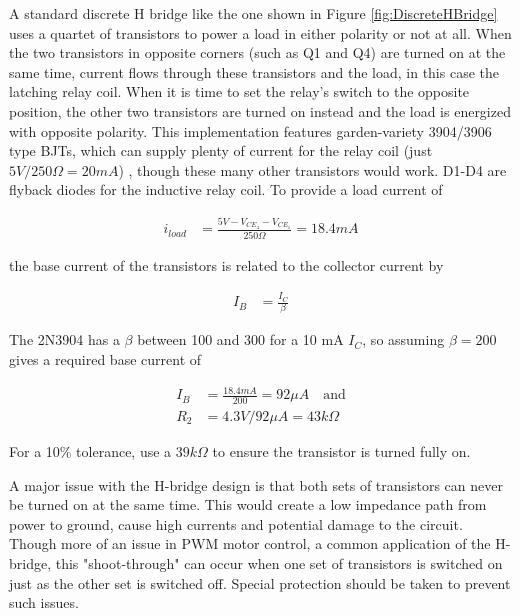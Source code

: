 \documentclass{article}
\begin{document}
		A standard discrete H bridge like the one shown in Figure \ref{fig:DiscreteHBridge} uses a quartet of transistors to power a load in either polarity or not at all.  When the two transistors in opposite corners (such as Q1 and Q4) are turned on at the same time, current flows through these transistors and the load, in this case the latching relay coil.  When it is time to set the relay's switch to the opposite position, the other two transistors are turned on instead and the load is energized with opposite polarity.  This implementation features garden-variety 3904/3906 type BJTs, which can supply plenty of current for the relay coil (just $5V/250\Omega = 20 mA$) \cite{EA2datasheet}\cite{2N3904datasheet}\cite{2N3906datasheet}, though these many other transistors would work.  D1-D4 are flyback diodes for the inductive relay coil.  To provide a load current of 

		\begin{align}
			i_{load} &= \frac{5V - V_{CE_4} - V_{CE_1}}{250 \Omega} = 18.4 mA
		\end{align}

		the base current of the transistors is related to the collector current by

		\begin{align}
			I_B &= \frac{I_C}{\beta}
		\end{align}

		The 2N3904 has a $\beta$ between 100 and 300 for a 10 mA $I_C$, so assuming $\beta = 200$ gives a required base current of

		\begin{align}
			I_B &= \frac{18.4mA}{200} = 92 \mu A \quad \text{and} \\
			R_2 &= 4.3V/92\mu A = 43 k\Omega
		\end{align}

		For a 10\% tolerance, use a $39k\Omega$ to ensure the transistor is turned fully on.

		A major issue with the H-bridge design is that both sets of transistors can never be turned on at the same time.  This would create a low impedance path from power to ground, cause high currents and potential damage to the circuit.  Though more of an issue in PWM motor control, a common application of the H-bridge, this "shoot-through" can occur when one set of transistors is switched on just as the other set is switched off.  Special protection should be taken to prevent such issues.
\end{document}
